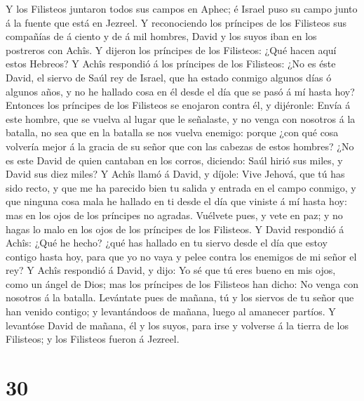  Y los Filisteos juntaron todos sus campos en Aphec; é
Israel puso su campo junto á la fuente que está en Jezreel.
 Y reconociendo los príncipes de los Filisteos sus
compañías de á ciento y de á mil hombres, David y los suyos iban en los
postreros con Achîs.  Y dijeron los príncipes de los
Filisteos: ¿Qué hacen aquí estos Hebreos? Y Achîs respondió á los
príncipes de los Filisteos: ¿No es éste David, el siervo de Saúl rey de
Israel, que ha estado conmigo algunos días ó algunos años, y no he
hallado cosa en él desde el día que se pasó á mí hasta hoy?
 Entonces los príncipes de los Filisteos se enojaron
contra él, y dijéronle: Envía á este hombre, que se vuelva al lugar que
le señalaste, y no venga con nosotros á la batalla, no sea que en la
batalla se nos vuelva enemigo: porque ¿con qué cosa volvería mejor á la
gracia de su señor que con las cabezas de estos hombres? 
¿No es este David de quien cantaban en los corros, diciendo: Saúl hirió
sus miles, y David sus diez miles?  Y Achîs llamó á David,
y díjole: Vive Jehová, que tú has sido recto, y que me ha parecido bien
tu salida y entrada en el campo conmigo, y que ninguna cosa mala he
hallado en ti desde el día que viniste á mí hasta hoy: mas en los ojos
de los príncipes no agradas.  Vuélvete pues, y vete en
paz; y no hagas lo malo en los ojos de los príncipes de los Filisteos.
 Y David respondió á Achîs: ¿Qué he hecho? ¿qué has
hallado en tu siervo desde el día que estoy contigo hasta hoy, para que
yo no vaya y pelee contra los enemigos de mi señor el rey?
 Y Achîs respondió á David, y dijo: Yo sé que tú eres
bueno en mis ojos, como un ángel de Dios; mas los príncipes de los
Filisteos han dicho: No venga con nosotros á la batalla. 
Levántate pues de mañana, tú y los siervos de tu señor que han venido
contigo; y levantándoos de mañana, luego al amanecer partíos.
 Y levantóse David de mañana, él y los suyos, para irse y
volverse á la tierra de los Filisteos; y los Filisteos fueron á Jezreel.

\hypertarget{section-29}{%
\section{30}\label{section-29}}


